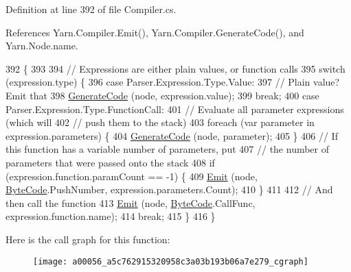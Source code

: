 Definition at line 392 of file Compiler.\-cs.



References Yarn.\-Compiler.\-Emit(), Yarn.\-Compiler.\-Generate\-Code(), and Yarn.\-Node.\-name.


\begin{DoxyCode}
392                                                                    \{
393 
394             \textcolor{comment}{// Expressions are either plain values, or function calls}
395             \textcolor{keywordflow}{switch} (expression.type) \{
396             \textcolor{keywordflow}{case} Parser.Expression.Type.Value:
397                 \textcolor{comment}{// Plain value? Emit that}
398                 \hyperlink{a00056_a006f3becd521cc179ba3d3352f6f930b}{GenerateCode} (node, expression.value);
399                 \textcolor{keywordflow}{break};
400             \textcolor{keywordflow}{case} Parser.Expression.Type.FunctionCall:
401                 \textcolor{comment}{// Evaluate all parameter expressions (which will}
402                 \textcolor{comment}{// push them to the stack)}
403                 \textcolor{keywordflow}{foreach} (var parameter \textcolor{keywordflow}{in} expression.parameters) \{
404                     \hyperlink{a00056_a006f3becd521cc179ba3d3352f6f930b}{GenerateCode} (node, parameter);
405                 \}
406                 \textcolor{comment}{// If this function has a variable number of parameters, put}
407                 \textcolor{comment}{// the number of parameters that were passed onto the stack}
408                 \textcolor{keywordflow}{if} (expression.function.paramCount == -1) \{
409                     \hyperlink{a00056_a774e8c143cdda0584fcfdda98626a83c}{Emit} (node, \hyperlink{a00053_ad5dfb6ee68ca7469623ad3e459f98894}{ByteCode}.PushNumber, expression.parameters.Count);
410                 \}
411 
412                 \textcolor{comment}{// And then call the function}
413                 \hyperlink{a00056_a774e8c143cdda0584fcfdda98626a83c}{Emit} (node, \hyperlink{a00053_ad5dfb6ee68ca7469623ad3e459f98894}{ByteCode}.CallFunc, expression.function.name);
414                 \textcolor{keywordflow}{break};
415             \}
416         \}
\end{DoxyCode}


Here is the call graph for this function\-:
\nopagebreak
\begin{figure}[H]
\begin{center}
\leavevmode
\texttt{[image: a00056\_a5c762915320958c3a03b193b06a7e279\_cgraph]}
\end{center}
\end{figure}


